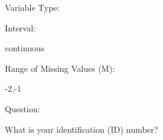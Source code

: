 \documentclass[
]{article}
\begin{document}
\begin{minipage}[t]{0.3\linewidth}

Variable Type:

\end{minipage}%
\begin{minipage}[t]{0.7\linewidth}

\end{minipage}

\begin{minipage}[t]{0.3\linewidth}

Interval:

\end{minipage}%
\begin{minipage}[t]{0.7\linewidth}

continuous

\end{minipage}

\begin{minipage}[t]{0.3\linewidth}

Range of Missing Values (M):

\end{minipage}%
\begin{minipage}[t]{0.7\linewidth}

-2,-1

\end{minipage}

\begin{minipage}[t]{0.3\linewidth}

Question:

\end{minipage}%
\begin{minipage}[t]{0.7\linewidth}

What is your identification (ID) number?

\end{minipage}
\end{document}
